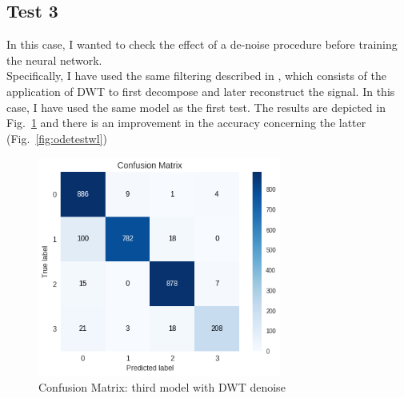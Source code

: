 \documentclass[LaM,binding=0.6cm]{sapthesis}
\begin{document}
\subsection{Test 3}
In this case, I wanted to check the effect of a de-noise procedure before training the neural network.\\Specifically, I have used the same filtering described in \cite{svmnl}, which consists of the application of DWT to first decompose and later reconstruct the signal. In this case, I have used the same model as the first test. The results are depicted in Fig.~\ref{fig:odedwt} and there is an improvement in the accuracy concerning the latter (Fig.~\ref{fig:odetestwl}) 
\begin{figure}[H]  \centering
    \includegraphics[width=80mm,scale=0.7]{odedwt.png}
    \caption{Confusion Matrix: third model with DWT denoise}
    \label{fig:odedwt}
\end{figure}
\end{document}
